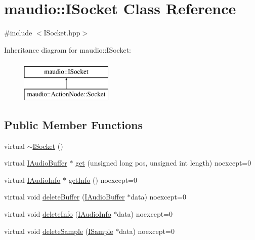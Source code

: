 \hypertarget{classmaudio_1_1ISocket}{\section{maudio\-:\-:I\-Socket Class Reference}
\label{classmaudio_1_1ISocket}
}


{\ttfamily \#include $<$I\-Socket.\-hpp$>$}

Inheritance diagram for maudio\-:\-:I\-Socket\-:\begin{figure}[H]
\begin{center}
\leavevmode
\includegraphics[height=2.000000cm]{classmaudio_1_1ISocket}
\end{center}
\end{figure}
\subsection*{Public Member Functions}
\begin{DoxyCompactItemize}
\item 
virtual \hyperlink{classmaudio_1_1ISocket_a455056af6aaddbea92f1bf6d5cdfc658}{$\sim$\-I\-Socket} ()
\item 
virtual \hyperlink{classmaudio_1_1IAudioBuffer}{I\-Audio\-Buffer} $\ast$ \hyperlink{classmaudio_1_1ISocket_a6a2d1f172963b079563c015ae7338db1}{get} (unsigned long pos, unsigned int length) noexcept=0
\item 
virtual \hyperlink{classmaudio_1_1IAudioInfo}{I\-Audio\-Info} $\ast$ \hyperlink{classmaudio_1_1ISocket_a43b1b9ab16b93131ba7d11204cbe5558}{get\-Info} () noexcept=0
\item 
virtual void \hyperlink{classmaudio_1_1ISocket_a8015c32967e28f35c6abdbe979e4f318}{delete\-Buffer} (\hyperlink{classmaudio_1_1IAudioBuffer}{I\-Audio\-Buffer} $\ast$data) noexcept=0
\item 
virtual void \hyperlink{classmaudio_1_1ISocket_a180a1cb55da56375612a5bdc53be61ee}{delete\-Info} (\hyperlink{classmaudio_1_1IAudioInfo}{I\-Audio\-Info} $\ast$data) noexcept=0
\item 
virtual void \hyperlink{classmaudio_1_1ISocket_ae67025d3d0befc48cbfd11bd05da1386}{delete\-Sample} (\hyperlink{classmaudio_1_1ISample}{I\-Sample} $\ast$data) noexcept=0
\end{DoxyCompactItemize}


